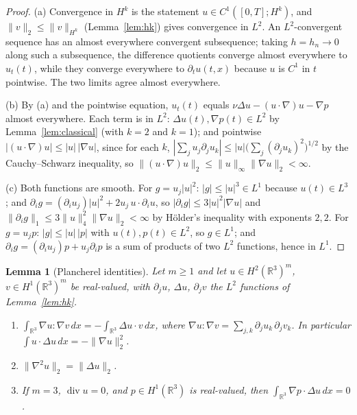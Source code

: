 \documentclass[11pt]{article}
\newtheorem{lemma}[theorem]{Lemma}
\theoremstyle{definition}
\theoremstyle{plain}
\newcommand{\R}{\mathbb R}
\begin{document}
\begin{proof}
(a) Convergence in $H^k$ is the statement $u\in C^1([0,T];H^k)$, and
$\|v\|_2\le\|v\|_{H^k}$ (Lemma~\ref{lem:hk}) gives convergence in $L^2$.
An $L^2$-convergent sequence has an almost everywhere convergent
subsequence; taking $h=h_n\to0$ along such a subsequence, the difference
quotients converge almost everywhere to $u_t(t)$, while they converge
everywhere to $\partial_tu(t,x)$ because $u$ is $C^1$ in $t$ pointwise.
The two limits agree almost everywhere.

(b) By (a) and the pointwise equation, $u_t(t)$ equals
$\nu\Delta u-(u\cdot\nabla)u-\nabla p$ almost everywhere.  Each term is in
$L^2$: $\Delta u(t),\nabla p(t)\in L^2$ by Lemma~\ref{lem:classical} (with
$k=2$ and $k=1$); and pointwise $|(u\cdot\nabla)u|\le|u|\,|\nabla u|$, since
for each $k$, $|\sum_ju_j\partial_ju_k|\le|u|\bigl(\sum_j(\partial_ju_k)^2\bigr)^{1/2}$
by the Cauchy--Schwarz inequality, so
$\|(u\cdot\nabla)u\|_2\le\|u\|_\infty\|\nabla u\|_2<\infty$.

(c) Both functions are smooth.  For $g=u_j|u|^2$: $|g|\le|u|^3\in L^1$
because $u(t)\in L^3$; and
$\partial_ig=(\partial_iu_j)|u|^2+2u_j\,u\cdot\partial_iu$, so
$|\partial_ig|\le3|u|^2|\nabla u|$ and
$\|\partial_ig\|_1\le3\|u\|_4^2\|\nabla u\|_2<\infty$ by H\"older's
inequality with exponents $2,2$.  For $g=u_jp$: $|g|\le|u|\,|p|$ with
$u(t),p(t)\in L^2$, so $g\in L^1$; and
$\partial_ig=(\partial_iu_j)p+u_j\partial_ip$ is a sum of products of two
$L^2$ functions, hence in $L^1$.
\end{proof}

\begin{lemma}[Plancherel identities]\label{lem:plancherel}
Let $m\ge1$ and let $u\in H^2(\R^3)^m$, $v\in H^1(\R^3)^m$ be real-valued,
with $\partial_ju$, $\Delta u$, $\partial_jv$ the $L^2$ functions of
Lemma~\ref{lem:hk}.
\begin{enumerate}
\item[(i)] $\displaystyle\int_{\R^3}\nabla u:\nabla v\,dx
 =-\int_{\R^3}\Delta u\cdot v\,dx$, where
 $\nabla u:\nabla v=\sum_{j,k}\partial_ju_k\,\partial_jv_k$.  In particular
 $\int u\cdot\Delta u\,dx=-\|\nabla u\|_2^2$.
\item[(ii)] $\|\nabla^2u\|_2=\|\Delta u\|_2$.
\item[(iii)] If $m=3$, $\operatorname{div}u=0$, and $p\in H^1(\R^3)$ is
 real-valued, then $\displaystyle\int_{\R^3}\nabla p\cdot\Delta u\,dx=0$.
\end{enumerate}
\end{lemma}
\end{document}
